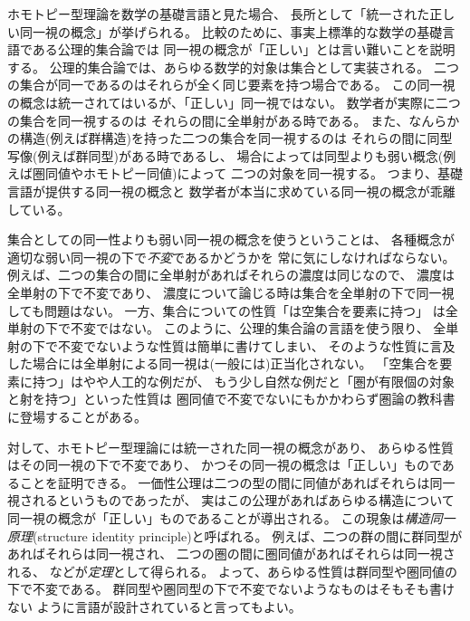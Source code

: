 \documentclass[index]{subfiles}
\begin{document}

ホモトピー型理論を数学の基礎言語と見た場合、
長所として「統一された正しい同一視の概念」が挙げられる。
比較のために、事実上標準的な数学の基礎言語である公理的集合論では
同一視の概念が「正しい」とは言い難いことを説明する。
公理的集合論では、あらゆる数学的対象は集合として実装される。
二つの集合が同一であるのはそれらが全く同じ要素を持つ場合である。
この同一視の概念は統一されてはいるが、「正しい」同一視ではない。
数学者が実際に二つの集合を同一視するのは
それらの間に全単射がある時である。
また、なんらかの構造(例えば群構造)を持った二つの集合を同一視するのは
それらの間に同型写像(例えば群同型)がある時であるし、
場合によっては同型よりも弱い概念(例えば圏同値やホモトピー同値)によって
二つの対象を同一視する。
つまり、基礎言語が提供する同一視の概念と
数学者が本当に求めている同一視の概念が乖離している。

集合としての同一性よりも弱い同一視の概念を使うということは、
各種概念が適切な弱い同一視の下で\emph{不変}であるかどうかを
常に気にしなければならない。
例えば、二つの集合の間に全単射があればそれらの濃度は同じなので、
濃度は全単射の下で不変であり、
濃度について論じる時は集合を全単射の下で同一視しても問題はない。
一方、集合についての性質「は空集合を要素に持つ」
は全単射の下で不変ではない。
このように、公理的集合論の言語を使う限り、
全単射の下で不変でないような性質は簡単に書けてしまい、
そのような性質に言及した場合には全単射による同一視は(一般には)正当化されない。
「空集合を要素に持つ」はやや人工的な例だが、
もう少し自然な例だと「圏が有限個の対象と射を持つ」といった性質は
圏同値で不変でないにもかかわらず圏論の教科書に登場することがある。

対して、ホモトピー型理論には統一された同一視の概念があり、
あらゆる性質はその同一視の下で不変であり、
かつその同一視の概念は「正しい」ものであることを証明できる。
一価性公理は二つの型の間に同値があればそれらは同一視されるというものであったが、
実はこの公理があればあらゆる構造について同一視の概念が「正しい」ものであることが導出される。
この現象は\emph{構造同一原理}(structure identity principle)と呼ばれる。
例えば、二つの群の間に群同型があればそれらは同一視され、
二つの圏の間に圏同値があればそれらは同一視される、
などが\emph{定理}として得られる。
よって、あらゆる性質は群同型や圏同値の下で不変である。
群同型や圏同型の下で不変でないようなものはそもそも書けない
ように言語が設計されていると言ってもよい。
\end{document}
